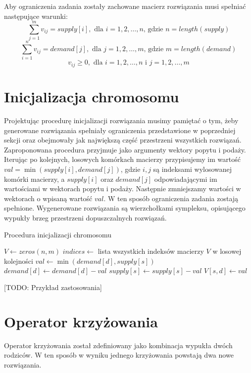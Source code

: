 Aby ograniczenia zadania zostały zachowane macierz rozwiązania musi spełniać następujące warunki:
$$\sum_{j=1}^{m} v_{ij} = supply[i], \text{ dla } i = 1, 2, \dots, n \text{, gdzie } n = length(supply)$$
$$\sum_{i=1}^{n} v_{ij} = demand[j], \text{ dla } j = 1, 2, \dots, m \text{, gdzie } m = length(demand)$$
$$v_{ij} \ge 0, \text{ dla } i = 1, 2, \dots, n \text{ i } j = 1, 2, \dots, m$$


\section{Inicjalizacja chromosomu}
Projektując procedurę inicjalizacji rozwiązania musimy pamiętać o tym, żeby generowane rozwiązania spełniały ograniczenia przedstawione 
w poprzedniej sekcji oraz obejmowały jak największą część przestrzeni wszystkich rozwiązań. Zaproponowana procedura przyjmuje jako argumenty 
wektory popytu i podaży. Iterując po kolejnych, losowych komórkach macierzy przypisujemy im wartość $val = \min(supply[i], demand[j])$, gdzie 
$i, j$ są indeksami wylosowanej komórki macierzy, a $supply[i]$ oraz $demand[j]$ odpowiadającymi im wartościami w wektorach popytu i podaży. 
Następnie zmniejszamy wartości w wektorach o wpisaną wartość $val$. W ten sposób ograniczenia zadania zostają spełnione. Wygenerowane rozwiązania są 
wierzchołkami sympleksu, opisującego wypukły brzeg przestrzeni dopuszczalnych rozwiązań.

\begin{pseudokod}[H]
    \label{inicjalizacja-1}
    \caption{Procedura inicjalizacji chromosomu}
    \BlankLine
    $V \gets zeros(n, m)$
    $indices \gets$ lista wszystkich indeksów macierzy $V$ w losowej kolejności\;
    \BlankLine
     {
        $val \gets \min(demand[d], supply[s])$\;
        $demand[d] \gets demand[d] - val$\;
        $supply[s] \gets supply[s] - val$\;
        $V[s, d] \gets val$\;
    }

\end{pseudokod}

[TODO: Przykład zastosowania]


\section{Operator krzyżowania}
Operator krzyżowania został zdefiniowany jako kombinacja wypukła dwóch rodziców. W ten sposób w wyniku jednego krzyżowania powstają dwa nowe 
rozwiązania.

